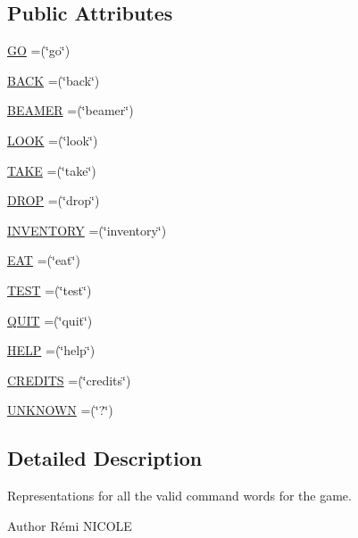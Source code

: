 \subsection*{Public Attributes}
\begin{DoxyCompactItemize}
\item 
\hyperlink{enumpkg__parsing_1_1CommandWord_a82b58f470d1dbcf2a9e5826632d66524}{G\-O} =(\char`\"{}go\char`\"{})
\item 
\hyperlink{enumpkg__parsing_1_1CommandWord_a7c6d90e3ff897725acfab8f68b28a1b1}{B\-A\-C\-K} =(\char`\"{}back\char`\"{})
\item 
\hyperlink{enumpkg__parsing_1_1CommandWord_a4d1c3647eaf81664624ed5effc590be4}{B\-E\-A\-M\-E\-R} =(\char`\"{}beamer\char`\"{})
\item 
\hyperlink{enumpkg__parsing_1_1CommandWord_a56f571b76d6ef6d6c64f9b2081b53e86}{L\-O\-O\-K} =(\char`\"{}look\char`\"{})
\item 
\hyperlink{enumpkg__parsing_1_1CommandWord_ae5353500b91f141ae399403b5e87cc28}{T\-A\-K\-E} =(\char`\"{}take\char`\"{})
\item 
\hyperlink{enumpkg__parsing_1_1CommandWord_abc97c312acca6eef77cc303d91d2d811}{D\-R\-O\-P} =(\char`\"{}drop\char`\"{})
\item 
\hyperlink{enumpkg__parsing_1_1CommandWord_a3dace936c35682fe74dad6714af270e4}{I\-N\-V\-E\-N\-T\-O\-R\-Y} =(\char`\"{}inventory\char`\"{})
\item 
\hyperlink{enumpkg__parsing_1_1CommandWord_a4fe488aea9cdd9ed9455682d42a300b3}{E\-A\-T} =(\char`\"{}eat\char`\"{})
\item 
\hyperlink{enumpkg__parsing_1_1CommandWord_acf61cb32b4d651f87b2cd342761f9a79}{T\-E\-S\-T} =(\char`\"{}test\char`\"{})
\item 
\hyperlink{enumpkg__parsing_1_1CommandWord_a2f645cd1791d5576f42e1fe14d202c17}{Q\-U\-I\-T} =(\char`\"{}quit\char`\"{})
\item 
\hyperlink{enumpkg__parsing_1_1CommandWord_ace035a3a624f4247b9f38c24eabe3f91}{H\-E\-L\-P} =(\char`\"{}help\char`\"{})
\item 
\hyperlink{enumpkg__parsing_1_1CommandWord_a4267a564de4d81cec28764b1eeb3ce22}{C\-R\-E\-D\-I\-T\-S} =(\char`\"{}credits\char`\"{})
\item 
\hyperlink{enumpkg__parsing_1_1CommandWord_a7a089aad12d2934da530b785a3daab49}{U\-N\-K\-N\-O\-W\-N} =(\char`\"{}?\char`\"{})
\end{DoxyCompactItemize}


\subsection{Detailed Description}
Representations for all the valid command words for the game. \begin{DoxyAuthor}{Author}
Rémi N\-I\-C\-O\-L\-E 
\end{DoxyAuthor}


